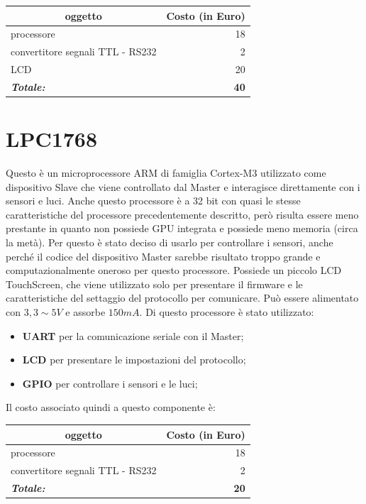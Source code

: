 \documentclass[a4paper,titlepage]{book}
\newcommand{\itema}{\begin{itemize}[noitemsep,topsep=10pt,parsep=5pt,partopsep=10pt]}
\begin{document}
\begin{tabular}{|l  r|}
\hline
\multicolumn{1}{|c|}{\textbf {oggetto}} & \multicolumn{1}{c|}{\textbf {Costo (in Euro)}} \\
\hline

processore 				& 18 \\
convertitore segnali TTL - RS232 	&  2  \\
LCD 					& 20 \\
\hline
\hline

\textit{\textbf{Totale:}}		& \textbf{40} \\

\hline
\end{tabular}
 

\section{LPC1768}



Questo è un microprocessore ARM di famiglia Cortex-M3 utilizzato come dispositivo Slave che viene controllato dal Master e interagisce direttamente con i sensori e luci. Anche questo processore è a 32 bit con quasi le stesse caratteristiche del processore precedentemente descritto, però risulta essere meno prestante in quanto non possiede GPU integrata e possiede meno memoria (circa la metà). Per questo è stato deciso di usarlo per controllare i sensori, anche perché il codice del dispositivo Master sarebbe risultato troppo grande e computazionalmente oneroso per questo processore. Possiede un piccolo LCD TouchScreen, che viene utilizzato solo per presentare il firmware e le caratteristiche del settaggio del protocollo per comunicare. Può essere alimentato con $3,3 \sim 5 V$ e assorbe $150 mA$. Di questo processore è stato utilizzato:

\itema

\item \textbf{UART} per la comunicazione seriale con il Master;
\item \textbf{LCD} per presentare le impostazioni del protocollo;
\item \textbf{GPIO} per controllare i sensori e le luci;
\end{itemize}

Il costo associato quindi a questo componente è:

\begin{tabular}{|l  r|}
\hline
\multicolumn{1}{|c|}{\textbf {oggetto}} & \multicolumn{1}{c|}{\textbf {Costo (in Euro)}} \\
\hline

processore 				& 18 \\
convertitore segnali TTL - RS232 	&  2  \\
\hline
\hline

\textit{\textbf{Totale:}}		& \textbf{20} \\

\hline
\end{tabular}
\end{document}
